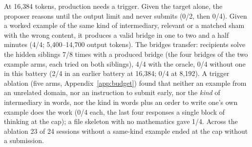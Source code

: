 \documentclass[11pt]{article}
\begin{document}
At 16{,}384 tokens, production needs a trigger. Given the target alone,
the proposer reasons until the output limit and never submits (0/2, then
0/4). Given a worked example of the same kind of intermediary, relevant
or a matched sham with the wrong content, it produces a valid bridge in
one to two and a half minutes (4/4; 5{,}400--14{,}700 output tokens). The
bridges transfer: recipients solve the hidden siblings 7/8 times with a
produced bridge (the four bridges of the two example arms, each tried on
both siblings), 4/4 with the oracle, 0/4 without one in this battery (2/4
in an earlier battery at 16{,}384; 0/4 at 8{,}192). A trigger ablation
(five arms, Appendix~\ref{app:budget}) found that neither an example from
an unrelated domain, nor an instruction to submit early, nor the
\emph{kind} of intermediary in words, nor the kind in words plus an order
to write one's own example does the work (0/4 each, the last four
responses a single block of thinking at the cap); a file skeleton with no
mathematics gave 1/4. Across the ablation 23 of 24 sessions without a
same-kind example ended at the cap without a submission.
\end{document}
